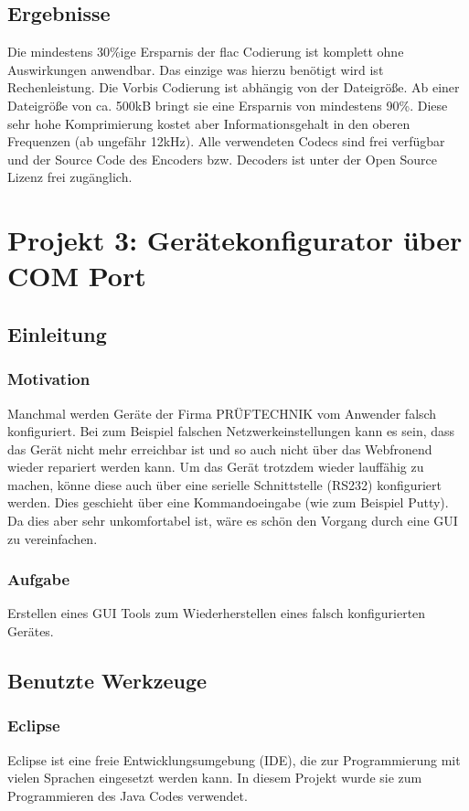\documentclass{article}
\begin{document}
	\subsection{Ergebnisse}
		Die mindestens 30\%ige Ersparnis der flac Codierung ist komplett ohne Auswirkungen anwendbar. Das einzige was hierzu benötigt wird ist Rechenleistung. Die Vorbis Codierung ist abhängig von der Dateigröße. Ab einer Dateigröße von ca. 500kB bringt sie eine Ersparnis von mindestens 90\%. Diese sehr hohe Komprimierung kostet aber Informationsgehalt in den oberen Frequenzen (ab ungefähr 12kHz).
		Alle verwendeten Codecs sind frei verfügbar und der Source Code des Encoders bzw. Decoders ist unter der Open Source Lizenz frei zugänglich.
		

\section{Projekt 3: Gerätekonfigurator über COM Port} 
	\subsection{Einleitung}
		\subsubsection{Motivation}
			Manchmal werden Geräte der Firma PRÜFTECHNIK vom Anwender falsch konfiguriert. Bei zum Beispiel falschen Netzwerkeinstellungen kann es sein, dass das Gerät nicht mehr erreichbar ist und so auch nicht über das Webfronend wieder repariert werden kann.
			Um das Gerät trotzdem wieder lauffähig zu machen, könne diese auch über eine serielle Schnittstelle (RS232) konfiguriert werden. Dies geschieht über eine Kommandoeingabe (wie zum Beispiel Putty).
			Da dies aber sehr unkomfortabel ist, wäre es schön den Vorgang durch eine GUI zu vereinfachen.
		\subsubsection{Aufgabe}
			Erstellen eines GUI Tools zum Wiederherstellen eines falsch konfigurierten Gerätes.
	\subsection{Benutzte Werkzeuge}
		\subsubsection{Eclipse}
			Eclipse ist eine freie Entwicklungsumgebung (IDE), die zur Programmierung mit vielen Sprachen eingesetzt werden kann. In diesem Projekt wurde sie zum Programmieren des Java Codes verwendet.
\end{document}
